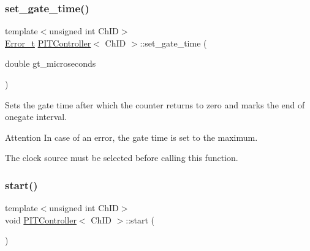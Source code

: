 \mbox{\label{group__Controls_gaaf7a79129a4ea5af057ea8f537b7ae9f}} 
\subsubsection{\texorpdfstring{set\+\_\+gate\+\_\+time()}{set\_gate\_time()}}
{\footnotesize\ttfamily template$<$unsigned int Ch\+ID$>$ \\
\hyperlink{errors_8hpp_a4e8c0d09726859e3d3369c0da5a1aa7f}{Error\+\_\+t} \hyperlink{classPITController}{P\+I\+T\+Controller}$<$ Ch\+ID $>$\+::set\+\_\+gate\+\_\+time (\begin{DoxyParamCaption}\item[{double}]{gt\+\_\+microseconds }\end{DoxyParamCaption})\hspace{0.3cm}{\ttfamily [inline]}}



Sets the gate time after which the counter returns to zero and marks the end of onegate interval. 

\begin{DoxyAttention}{Attention}
In case of an error, the gate time is set to the maximum. 

The clock source must be selected before calling this function. 
\end{DoxyAttention}
\mbox{\label{group__Controls_ga4dae1ed0ada64ebc03665e8f39795e7e}} 
\subsubsection{\texorpdfstring{start()}{start()}}
{\footnotesize\ttfamily template$<$unsigned int Ch\+ID$>$ \\
void \hyperlink{classPITController}{P\+I\+T\+Controller}$<$ Ch\+ID $>$\+::start (\begin{DoxyParamCaption}{ }\end{DoxyParamCaption})\hspace{0.3cm}{\ttfamily [inline]}}



